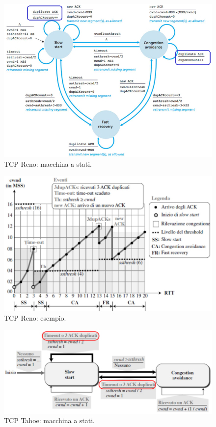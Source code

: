 \documentclass[11pt, italian, openany]{book}
\begin{document}
\begin{sloppypar}
\begin{figure}[!h]
	\centering
	\includegraphics[scale=0.3]{images/tcp-reno-fsm.png}
	\caption{TCP Reno: macchina a stati.}
	\label{fig:tcp-reno-fsm}
\end{figure}

\pagebreak

\begin{figure}[!h]
	\centering
	\includegraphics[scale=0.35]{images/tcp-reno-esempio.png}
	\caption{TCP Reno: esempio.}
	\label{fig:tcp-reno-esempio}
\end{figure}

\begin{figure}[!h]
	\centering
	\includegraphics[scale=0.35]{images/tcp-tahoe-fsm.png}
	\caption{TCP Tahoe: macchina a stati.}
	\label{fig:tcp-tahoe-fsm}
\end{figure}


\end{sloppypar}
\end{document}
